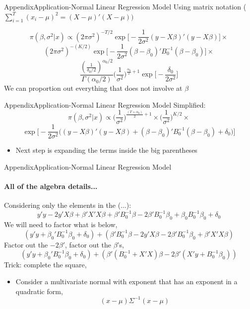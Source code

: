\documentclass[table]{beamer}
\newcommand{\Bzero}{B_0^{-1}}
\begin{document}
\begin{frame}{Appendix}{Application-Normal Linear Regression Model}
	Using matrix notation ($ \sum_{i=1}^{T} (x_i - \mu)^2 = (X -\mu)'(X-\mu) ) $
	
	\[\pi(\beta, \sigma^2 | x) \propto  (2\pi\sigma^2)^{-T/2} \exp\Big[ -\frac{1}{2\sigma^2}(y-X\beta)'(y-X\beta) \Big] \times \]
	\[ (2\pi\sigma^2)^{-(K/2)} \exp\Big[ -\frac{1}{2\sigma^2}(\beta - \beta_0)'B_0^{-1}(\beta - \beta_0) \Big] \times  \]
	\[ \frac{(\frac{1}{\delta_0/2} )^{\alpha_0/2}}{\Gamma(\alpha_0/2)}  \Big(\frac{1}{\sigma^2}\Big)^{\frac{\alpha_0}{2} + 1} \exp\Big[ -\frac{\delta_0}{2\sigma^2} \Big] \]
	We can proportion out everything that does not involve at $ \beta $
\end{frame}

\begin{frame}{Appendix}{Application-Normal Linear Regression Model}
	Simplified:
	\[  \pi(\beta, \sigma^2 | x) \propto \Big(\frac{1}{\sigma^2} \Big)^{  \frac{(T + \alpha_0)}{2} + 1 } \times
	\Big(\frac{1}{\sigma^2} \Big)^{  K/2 } \times \]
	\[ \exp\Big[-\frac{1}{2\sigma^2}\Big((y-X\beta)'(y-X\beta) + (\beta - \beta_0)'B_0^{-1}(\beta - \beta_0) + \delta_0\Big)\Big] \]
	\begin{itemize}
		\item Next step is expanding the terms inside the big parentheses 
	\end{itemize} 
\end{frame}

\begin{frame}{Appendix}{Application-Normal Linear Regression Model}
	\framesubtitle{All of the algebra details...}
	Considering only the elements in the (...):
	\[ y'y - 2y'X\beta + \beta'X'X\beta + \beta'B_0^{-1} \beta - 2\beta'B_0^{-1}\beta_0 + \beta_0B_0^{-1}\beta_0 + \delta_0 \]
	We will need to factor what is below, 
	\[ (y'y + \beta_0'\Bzero \beta_0 + \delta_0) + (\beta'\Bzero \beta  -2y'X\beta -2\beta'\Bzero\beta_0 + \beta'X'X\beta)   \]
	Factor out the $ -2\beta' $, factor out the $ \beta $'s, 
	\[ (y'y + \beta_0'\Bzero \beta_0 + \delta_0) +  (\beta'(\Bzero + X'X)\beta  -2\beta'(X'y + \Bzero\beta_0)) \]
	Trick: complete the square,
	\begin{itemize}
		\item Consider a multivariate normal with exponent that has an exponent in a quadratic form,
		\[ (x-\mu)\Sigma^{-1}(x-\mu) \]
	\end{itemize}
\end{frame}
\end{document}
